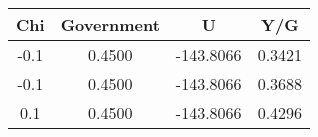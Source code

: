 \begin{tabular}{c c c c}
\hline
Chi & Government & U & Y/G \\
\hline
-0.1 & 0.4500 & -143.8066 & 0.3421 \\
-0.1 & 0.4500 & -143.8066 & 0.3688 \\
0.1 & 0.4500 & -143.8066 & 0.4296 \\
\hline
\end{tabular}
